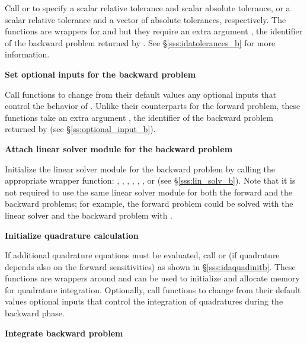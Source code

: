 \begin{Steps}
  Call  or 
  to specify a scalar relative tolerance and scalar absolute tolerance, or a
  scalar relative tolerance and a vector of absolute tolerances, respectively.
  The functions are wrappers for  and
   but they require an extra argument ,
  the identifier of the backward problem returned by .
  See \S\ref{sss:idatolerances_b} for more information.


\item
  {\bf Set optional inputs for the backward problem}

  Call  functions to change from their default values
  any optional inputs that control the behavior of {\idas}. Unlike
  their counterparts for the forward problem, these functions take an
  extra argument , the identifier of the backward problem returned 
  by  (see \S\ref{ss:optional_input_b}).


\item \label{i:lin_solverB}
  {\bf Attach linear solver module for the backward problem}

  Initialize the linear solver module 
  for the backward problem by calling the appropriate wrapper
  function: , , , ,
  , , or  (see \S\ref{sss:lin_solv_b}). 
  Note that it is not required to use the same linear solver module for both the forward 
  and the backward problems; for example, the forward problem could be solved
  with the {\idadense} linear solver and the backward problem with {\idaspgmr}.

\item \label{i:quadB}
  {\bf Initialize quadrature calculation}

  If additional quadrature equations must be evaluated, 
  call  or  (if quadrature depends also on the
  forward sensitivities) as shown in \S\ref{sss:idaquadinitb}. These functions are
  wrappers around  and can be used to initialize and allocate 
  memory for quadrature integration. Optionally, call  functions 
  to change from their default values optional inputs that control the integration 
  of quadratures during the backward phase.

\item
  {\bf Integrate backward problem}


\end{Steps}
